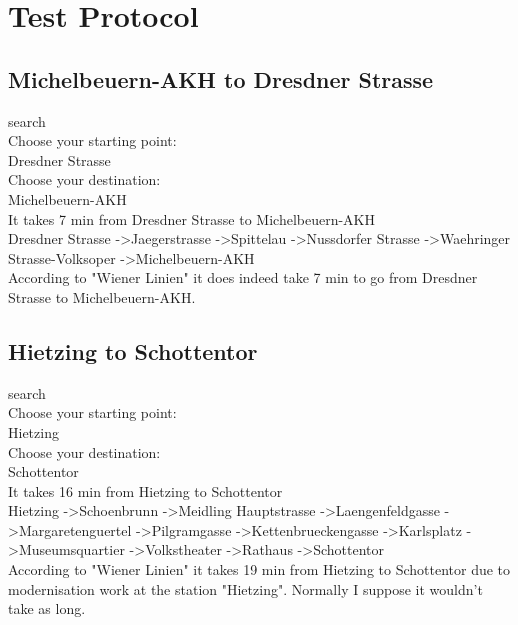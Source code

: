 \documentclass[12pt]{article}
\begin{document}
\section{Test Protocol}
\subsection {Michelbeuern-AKH to Dresdner Strasse}
search\\
Choose your starting point:\\ 
Dresdner Strasse\\
Choose your destination:\\
Michelbeuern-AKH\\
It takes 7 min from Dresdner Strasse to Michelbeuern-AKH\\
Dresdner Strasse -\textgreater Jaegerstrasse -\textgreater Spittelau -\textgreater Nussdorfer Strasse -\textgreater Waehringer Strasse-Volksoper -\textgreater Michelbeuern-AKH\\

\noindent According to "Wiener Linien" it does indeed take 7 min to go from Dresdner Strasse to Michelbeuern-AKH.

\subsection{Hietzing to Schottentor}
search\\
Choose your starting point:\\ 
Hietzing\\
Choose your destination:\\ 
Schottentor\\
It takes 16 min from Hietzing to Schottentor\\
Hietzing -\textgreater Schoenbrunn -\textgreater Meidling Hauptstrasse -\textgreater Laengenfeldgasse -\textgreater Margaretenguertel -\textgreater Pilgramgasse -\textgreater Kettenbrueckengasse -\textgreater Karlsplatz -\textgreater Museumsquartier -\textgreater Volkstheater -\textgreater Rathaus -\textgreater Schottentor\\

\noindent According to "Wiener Linien" it takes 19 min from Hietzing to Schottentor due to modernisation work at the station "Hietzing". Normally I suppose it wouldn't take as long.
\end{document}
